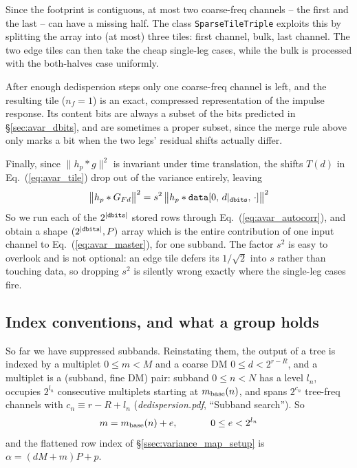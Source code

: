 \documentclass{article}
\numberwithin{equation}{section}   %
\newcommand{\ddnotes}[1]{{\em dedispersion.pdf}, ``#1''}
\begin{document}
Since the footprint is contiguous, at most two coarse-freq channels -- the first and the last --
can have a missing half. The class \verb|SparseTileTriple| exploits this by splitting the array
into (at most) three tiles: first channel, bulk, last channel. The two edge tiles can then take
the cheap single-leg cases, while the bulk is processed with the both-halves case uniformly.

After enough dedispersion steps only one coarse-freq channel is left, and the resulting tile
($n_f=1$) is an exact, compressed representation of the impulse response. Its content bits are
always a subset of the bits predicted in \S\ref{sec:avar_dbits}, and are sometimes a proper
subset, since the merge rule above only marks a bit when the two legs' residual shifts actually
differ.

Finally, since $\|h_p * g\|^2$ is invariant under time translation, the shifts $T(d)$ in
Eq.\ (\ref{eq:avar_tile}) drop out of the variance entirely, leaving
\begin{equation}
\big\| h_p * G_{Fd} \big\|^2 = s^2 \, \big\| h_p * {\tt data}[0, \, d|_{\tt dbits}, \, \cdot] \big\|^2
  \label{eq:avar_tile_variance}
\end{equation}
So we run each of the $2^{|{\tt dbits}|}$ stored rows through Eq.\ (\ref{eq:avar_autocorr}), and
obtain a shape $(2^{|{\tt dbits}|}, P)$ array which is the entire contribution of one input
channel to Eq.\ (\ref{eq:avar_master}), for one subband. The factor $s^2$ is easy to overlook and
is not optional: an edge tile defers its $1/\sqrt2$ into $s$ rather than touching data, so
dropping $s^2$ is silently wrong exactly where the single-leg cases fire.

\subsection{Index conventions, and what a group holds}
\label{ssec:avar_map_indices}

So far we have suppressed subbands. Reinstating them, the output of a tree is indexed by a
multiplet $0 \le m < M$ and a coarse DM $0 \le d < 2^{r-R}$, and a multiplet is a
(subband, fine DM) pair: subband $0 \le n < N$ has a level $l_n$, occupies $2^{l_n}$ consecutive
multiplets starting at $m_{\rm base}(n)$, and spans $2^{c_n}$ tree-freq channels with
$c_n \equiv r - R + l_n$ (\ddnotes{Subband search}). So
\begin{equation}
m = m_{\rm base}(n) + e, \hspace{1.2cm} 0 \le e < 2^{l_n}
\end{equation}
and the flattened row index of \S\ref{ssec:variance_map_setup} is
$\alpha = (d M + m) P + p$.
\end{document}
